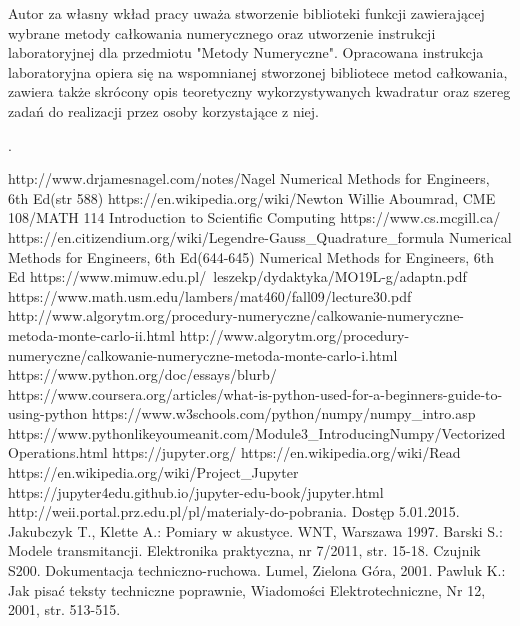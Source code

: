 \documentclass[12pt,twoside]{article}
\begin{document}
 Autor za własny wkład pracy uważa stworzenie biblioteki funkcji zawierającej wybrane metody całkowania numerycznego oraz utworzenie instrukcji laboratoryjnej dla przedmiotu "Metody Numeryczne". Opracowana instrukcja laboratoryjna opiera się na wspomnianej stworzonej bibliotece metod całkowania, zawiera także skrócony opis teoretyczny wykorzystywanych kwadratur oraz szereg zadań do realizacji przez osoby korzystające z niej.
 
.
\clearpage


\begin{thebibliography}{4}
 http://www.drjamesnagel.com/notes/Nagel%
 Numerical Methods for Engineers, 6th Ed(str 588)
 https://en.wikipedia.org/wiki/Newton%
 Willie Aboumrad, CME 108/MATH 114 Introduction to Scientific Computing
 https://www.cs.mcgill.ca/
 https://en.citizendium.org/wiki/Legendre-Gauss\_Quadrature\_formula
 Numerical Methods for Engineers, 6th Ed(644-645)
 Numerical Methods for Engineers, 6th Ed
 https://www.mimuw.edu.pl/~leszekp/dydaktyka/MO19L-g/adaptn.pdf
 https://www.math.usm.edu/lambers/mat460/fall09/lecture30.pdf
 http://www.algorytm.org/procedury-numeryczne/calkowanie-numeryczne-metoda-monte-carlo-ii.html
 http://www.algorytm.org/procedury-numeryczne/calkowanie-numeryczne-metoda-monte-carlo-i.html
 https://www.python.org/doc/essays/blurb/
 https://www.coursera.org/articles/what-is-python-used-for-a-beginners-guide-to-using-python
 https://www.w3schools.com/python/numpy/numpy\_intro.asp
 https://www.pythonlikeyoumeanit.com/Module3\_IntroducingNumpy/VectorizedOperations.html
 https://jupyter.org/
 https://en.wikipedia.org/wiki/Read%
 https://en.wikipedia.org/wiki/Project\_Jupyter
 https://jupyter4edu.github.io/jupyter-edu-book/jupyter.html
 http://weii.portal.prz.edu.pl/pl/materialy-do-pobrania. Dostęp 5.01.2015.
 Jakubczyk T., Klette A.: Pomiary w akustyce. WNT, Warszawa 1997.
 Barski S.: Modele transmitancji. Elektronika praktyczna, nr 7/2011, str. 15-18.
 Czujnik S200. Dokumentacja techniczno-ruchowa. Lumel, Zielona Góra, 2001.
 Pawluk K.: Jak pisać teksty techniczne poprawnie, Wiadomości Elektrotechniczne, Nr 12, 2001, str. 513-515.
\end{thebibliography}

\clearpage

\makesummary
\end{document}
